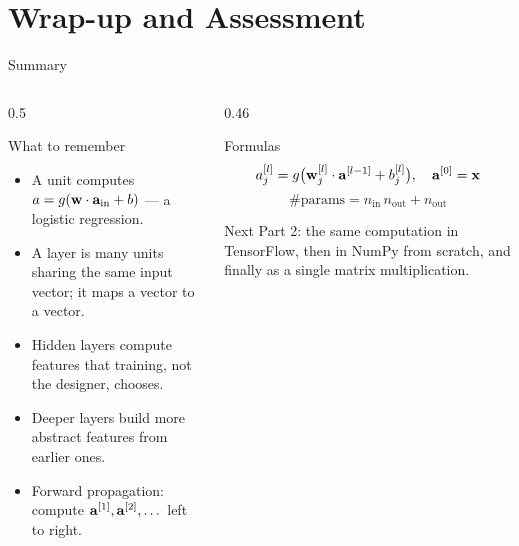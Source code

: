 \documentclass[aspectratio=169,10pt]{beamer}
\begin{document}
\section{Wrap-up and Assessment}

\begin{frame}{Summary}
  \begin{columns}[T,onlytextwidth]
    \begin{column}{0.5\textwidth}
      \begin{block}{What to remember}
        \footnotesize
        \begin{itemize}
          \item A unit computes $a=g(\mathbf{w}\cdot\mathbf{a}_{\text{in}}+b)$ --- a logistic regression.
          \item A layer is many units sharing the same input vector; it maps a vector to a
                vector.
          \item Hidden layers compute features that training, not the designer, chooses.
          \item Deeper layers build more abstract features from earlier ones.
          \item Forward propagation: compute $\mathbf{a}^{[1]},\mathbf{a}^{[2]},\dots$ left to right.
        \end{itemize}
      \end{block}
    \end{column}
    \begin{column}{0.46\textwidth}
      \begin{block}{Formulas}
        \[ a^{[l]}_j = g\bigl(\mathbf{w}^{[l]}_j\cdot\mathbf{a}^{[l-1]} + b^{[l]}_j\bigr),\quad \mathbf{a}^{[0]}=\mathbf{x} \]
        \[ \#\text{params} = n_{\text{in}}\,n_{\text{out}}+n_{\text{out}} \]
      \end{block}
      \begin{block}{Next}
        \footnotesize Part 2: the same computation in TensorFlow, then in NumPy from scratch,
        and finally as a single matrix multiplication.
      \end{block}
    \end{column}
  \end{columns}
\end{frame}
\end{document}
